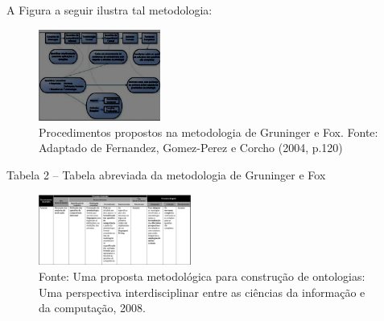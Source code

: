 \documentclass[a4paper]{report}
\begin{document}
A Figura a seguir ilustra tal metodologia:

\begin{figure}[h] 
\centering %
\includegraphics[width=4cm]{Figuras/3.png} %
\caption{Procedimentos propostos na metodologia de Gruninger e Fox. 
Fonte: Adaptado de Fernandez, Gomez-Perez e Corcho (2004, p.120)}
\end{figure}

Tabela 2 – Tabela abreviada da metodologia de Gruninger e Fox

\begin{figure}[h] 
\centering %
\includegraphics[width=5cm]{Figuras/4.png} %
\caption{Fonte: Uma proposta metodológica para construção de ontologias: Uma perspectiva interdisciplinar entre as ciências da informação e da computação, 2008.}
\end{figure}
\end{document}
